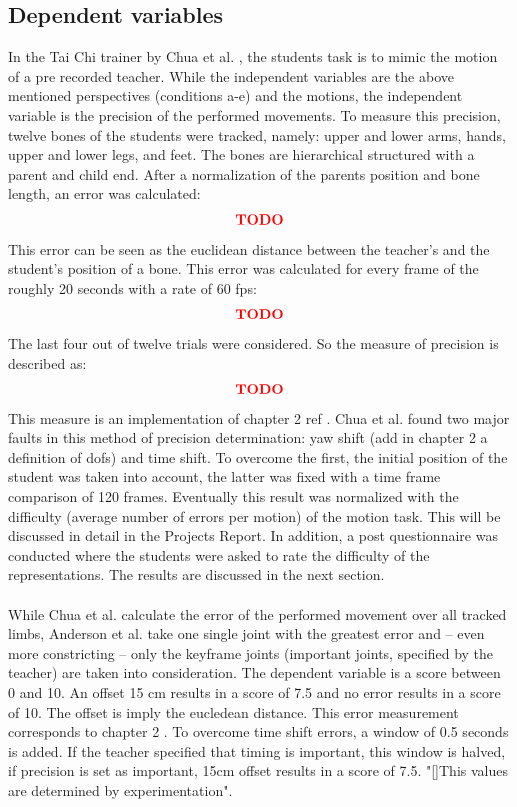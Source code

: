 \subsection{Dependent variables}
In the Tai Chi trainer by Chua et al. \cite{Chua2003}, the students task is to mimic the motion of a pre recorded teacher. While the independent variables are the above mentioned perspectives (conditions a-e) and the motions, the independent variable is the precision of the performed movements. To measure this precision, twelve bones of the students were tracked, namely: upper and lower arms, hands, upper and lower legs, and feet. The bones are hierarchical structured with a parent and child end. After a normalization of the parents position and bone length, an error was calculated:
\begin{equation}
	\textcolor{red}{\textbf{TODO}}
\end{equation}
This error can be seen as the euclidean distance between the teacher's and the student's position of a bone. This error was calculated for every frame of the roughly 20 seconds with a rate of 60 fps:
\begin{equation}
	\textcolor{red}{\textbf{TODO}}
\end{equation}
The last four out of twelve trials were considered. So the measure of precision is described as:
\begin{equation}
	\textcolor{red}{\textbf{TODO}}
\end{equation}
This measure is an implementation of chapter 2 ref \todo.
Chua et al. found two major faults in this method of precision determination: yaw shift (\todo add in chapter 2 a definition of dofs) and time shift. To overcome the first, the initial position of the student was taken into account, the latter was fixed with a time frame comparison of 120 frames. Eventually this result was normalized with the difficulty (average number of errors per motion) of the motion task. This will be discussed in detail in the Projects Report. In addition, a post questionnaire was conducted where the students were asked to rate the difficulty of the representations. The results are discussed in the next section.\\ \\
While Chua et al. calculate the error of the performed movement over all tracked limbs, Anderson et al. take one single joint with the greatest error and \--- even more constricting \--- only the keyframe joints (important joints, specified by the teacher) are taken into consideration. The dependent variable is a score between 0 and 10. An offset 15 cm results in a score of 7.5 and no error results in a score of 10. The offset is imply the eucledean distance. This error measurement corresponds to chapter 2 \todo. To overcome time shift errors, a window of 0.5 seconds is added. If the teacher specified that timing is important, this window is halved, if precision is set as important, 15cm offset results in a score of 7.5. "[]This values are determined by experimentation".\\ \\
